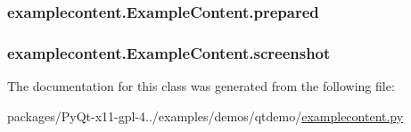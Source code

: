\subsubsection[{prepared}]{\setlength{\rightskip}{0pt plus 5cm}examplecontent.\+Example\+Content.\+prepared}\label{classexamplecontent_1_1ExampleContent_ac2cb30b5e7808625edcf7f85f7892f38}
\hypertarget{classexamplecontent_1_1ExampleContent_a7806dda86009a9164044a20545da330f}{}
\subsubsection[{screenshot}]{\setlength{\rightskip}{0pt plus 5cm}examplecontent.\+Example\+Content.\+screenshot}\label{classexamplecontent_1_1ExampleContent_a7806dda86009a9164044a20545da330f}


The documentation for this class was generated from the following file\+:\begin{DoxyCompactItemize}
\item 
packages/\+Py\+Qt-\/x11-\/gpl-\/4../examples/demos/qtdemo/\hyperlink{examplecontent_8py}{examplecontent.\+py}\end{DoxyCompactItemize}
